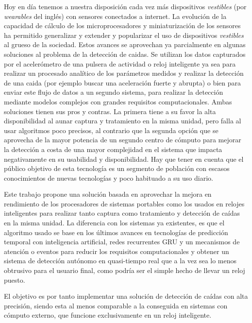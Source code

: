 \documentclass[../tfm.tex]{subfiles}
\begin{document}
Hoy en día tenemos a nuestra disposición cada vez más dispositivos \textit{vestibles} (por \textit{wearables} del inglés) con sensores conectados a internet. La evolución de la capacidad de cálculo de los microprocesadores y miniaturización de los sensores ha permitido generalizar y extender y popularizar el uso de dispositivos \textit{vestibles} al grueso de la sociedad. Estos avances se aprovechan ya parcialmente en algunas soluciones al problema de la detección de caidas. Se utilizan los datos capturados por el acelerómetro de una pulsera de actividad o reloj inteligente ya sea para realizar un procesado analítico de los parámetros medidos y realizar la detección de una caida (por ejemplo buscar una aceleración fuerte y abrupta) o bien para enviar este flujo de datos a un segundo sistema, para realizar la detección mediante modelos complejos con grandes requisitos computacionales. Ambas soluciones tienen sus pros y contras. La primera tiene a su favor la alta disponibilidad al aunar captura y tratamiento en la misma unidad, pero falla al usar algoritmos poco precisos, al contrario que la segunda opción que se aprovecha de la mayor potencia de un segundo centro de cómputo para mejorar la detección a costa de una mayor complejidad en el sistema que impacta negativamente en su usabilidad y disponibilidad. Hay que tener en cuenta que el público objetivo de esta tecnología es un segmento de población con escasos conocimientos de nuevas tecnologías y poco habituado a su uso diario.

Este trabajo propone una solución basada en aprovechar la mejora en rendimiento de los procesadores de sistemas portables como los usados en relojes inteligentes para realizar tanto captura como tratamiento y detección de caídas en la misma unidad. La diferencia con los sistemas ya existentes, es que el algoritmo usado se base en los últimos avances en tecnologías de predicción temporal con inteligencia artificial, redes recurrentes GRU y un mecanismos de atención o eventos para reducir los requisitos computacionales y obtener  un sistema de detección autónomo en quasi-tiempo real que a la vez sea lo menos obtrusivo para el usuario final, como podría ser el simple hecho de llevar un reloj puesto.

El objetivo es por tanto implementar una solución de detección de caídas con alta precisión, siendo esta al menos comparable a la conseguida en sistemas con cómputo externo, que funcione exclusivamente en un reloj inteligente.
\end{document}
